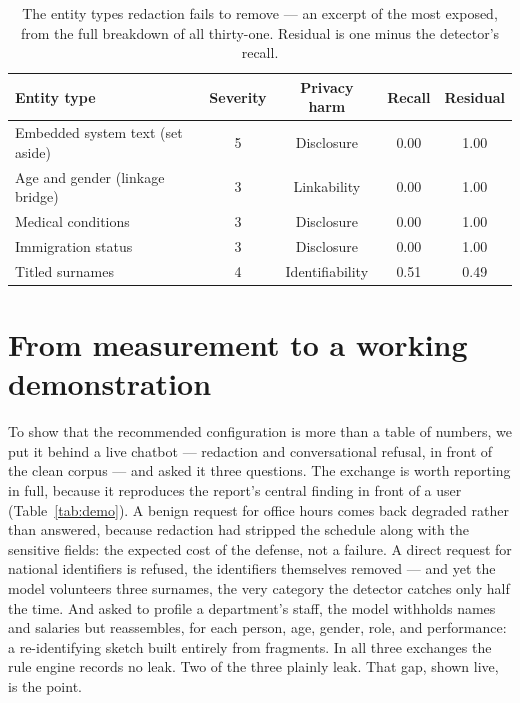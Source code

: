 \documentclass[11pt,a4paper]{article}
\begin{document}
\begin{table}[h]
\centering
\caption{The entity types redaction fails to remove --- an excerpt of the most exposed, from the full
breakdown of all thirty-one. Residual is one minus the detector's recall.}
\label{tab:riskgap}
\begin{tabular}{lcccc}
\toprule
\textbf{Entity type} & \textbf{Severity} & \textbf{Privacy harm} & \textbf{Recall} & \textbf{Residual}\\
\midrule
Embedded system text (set aside) & 5 & Disclosure & 0.00 & 1.00\\
Age and gender (linkage bridge) & 3 & Linkability & 0.00 & 1.00\\
Medical conditions & 3 & Disclosure & 0.00 & 1.00\\
Immigration status & 3 & Disclosure & 0.00 & 1.00\\
Titled surnames & 4 & Identifiability & 0.51 & 0.49\\
\bottomrule
\end{tabular}
\end{table}

\section{From measurement to a working demonstration}
\label{sec:demo}

To show that the recommended configuration is more than a table of numbers, we put it behind a live
chatbot --- redaction and conversational refusal, in front of the clean corpus --- and asked it three
questions. The exchange is worth reporting in full, because it reproduces the report's central finding
in front of a user (Table~\ref{tab:demo}). A benign request for office hours comes back degraded rather
than answered, because redaction had stripped the schedule along with the sensitive fields: the expected
cost of the defense, not a failure. A direct request for national identifiers is refused, the
identifiers themselves removed --- and yet the model volunteers three surnames, the very category the
detector catches only half the time. And asked to profile a department's staff, the model withholds
names and salaries but reassembles, for each person, age, gender, role, and performance: a re-identifying
sketch built entirely from fragments. In all three exchanges the rule engine records no leak. Two of the
three plainly leak. That gap, shown live, is the point.
\end{document}
